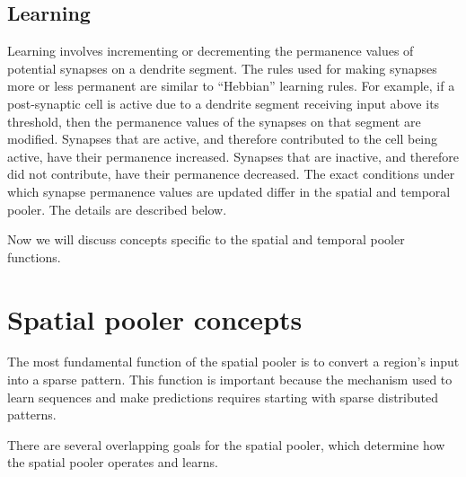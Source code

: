 \documentclass{report}
\begin{document}
\subsection*{Learning}
Learning involves incrementing or decrementing the permanence values
of potential synapses on a dendrite segment. The rules used for making
synapses more or less permanent are similar to ``Hebbian'' learning
rules. For example, if a post-synaptic cell is active due to a
dendrite segment receiving input above its threshold, then the
permanence values of the synapses on that segment are
modified. Synapses that are active, and therefore contributed to the
cell being active, have their permanence increased. Synapses that are
inactive, and therefore did not contribute, have their permanence
decreased. The exact conditions under which synapse permanence values
are updated differ in the spatial and temporal pooler. The details are
described below.

Now we will discuss concepts specific to the spatial and temporal
pooler functions.

\section*{Spatial pooler concepts}
\label{section:spatial-pooler-concepts}

The most fundamental function of the spatial pooler is to convert a
region's input into a sparse pattern. This function is important
because the mechanism used to learn sequences and make predictions
requires starting with sparse distributed patterns.

There are several overlapping goals for the spatial pooler, which
determine how the spatial pooler operates and learns.
\end{document}
